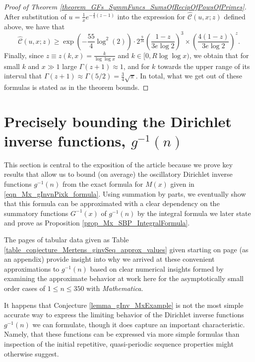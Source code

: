 \documentclass[11pt,reqno,a4letter]{article}
\numberwithin{figure}{section}
\numberwithin{table}{section}
\theoremstyle{plain}
\numberwithin{theorem}{section}
\theoremstyle{definition}
\begin{document}
\begin{proof}[Proof of Theorem \ref{theorem_GFs_SymmFuncs_SumsOfRecipOfPowsOfPrimes}]
After substitution of $u = \frac{1}{x} e^{-\frac{4}{3}(z-1)}$ into the expression for 
$\widehat{\mathcal{C}}(u, x; z)$ defined above, we have that 
\[
\widehat{\mathcal{C}}(u, x; z) \geq \exp\left(-\frac{55}{4} \log^2(2)\right) \cdot 2^{\frac{9}{16}} 
     \left(\frac{1-z}{3e\log 2}\right)^3 \times \left(\frac{4(1-z)}{3e\log 2}\right)^z. 
\]
Finally, since $z \equiv z(k, x) = \frac{k}{\log\log x}$ and $k \in [0, R\log\log x)$, we obtain that 
for small $k$ and $x \gg 1$ large $\Gamma(z+1) \approx 1$, and for $k$ towards the upper range of 
its interval that $\Gamma(z+1) \approx \Gamma(5/2) = \frac{3}{4} \sqrt{\pi}$. 
In total, what we get out of these formulas is stated as in the theorem bounds. 
\end{proof} 

\newpage
\section{Precisely bounding the Dirichlet inverse functions, $g^{-1}(n)$} 
\label{Section_InvFunc_PreciseExpsAndAsymptotics} 

This section is central to the exposition of the article because we prove key results that allow us to 
bound (on average) the oscillatory 
Dirichlet inverse functions $g^{-1}(n)$ from the exact formula for $M(x)$ given in 
\eqref{eqn_Mx_gInvnPixk_formula}. 
Using summation by parts, we eventually show that this formula can be approximated with a clear 
dependency on the summatory functions $G^{-1}(x)$ of $g^{-1}(n)$ by the integral formula we later 
state and prove as Proposition \ref{prop_Mx_SBP_IntegralFormula}. 

The pages of tabular data given as Table \ref{table_conjecture_Mertens_ginvSeq_approx_values} 
given starting on page \pageref{table_conjecture_Mertens_ginvSeq_approx_values} (as an appendix) 
provide insight into why we arrived at these convenient approximations to $g^{-1}(n)$ based on 
clear numerical insights formed by examining the approximate behavior 
at work here for the asymptotically 
small order cases of $1 \leq n \leq 350$ with \emph{Mathematica}. 

It happens that Conjecture \ref{lemma_gInv_MxExample} is not the most 
simple accurate way to express the limiting behavior of the 
Dirichlet inverse functions $g^{-1}(n)$ we can formulate, 
though it does capture an important characteristic. Namely, that these 
functions can be expressed via more simple formulas than inspection of the initial 
repetitive, quasi-periodic sequence properties might otherwise suggest. 
\end{document}

